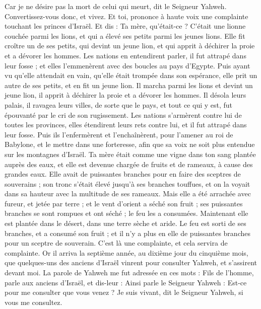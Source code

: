 \begin{multicols}{2}
Car je ne désire pas la mort de celui qui meurt, dit le Seigneur Yahweh. Convertissez-vous donc, et vivez.
\VerseOne{}Et toi, prononce à haute voix une complainte touchant les princes d'Israël.
Et dis : Ta mère, qu'était-ce ? C'était une lionne couchée parmi les lions, et qui a élevé ses petits parmi les jeunes lions.
Elle fit croître un de ses petits, qui devint un jeune lion, et qui apprit à déchirer la proie et a dévorer les hommes.
Les nations en entendirent parler, il fut attrapé dans leur fosse ; et elles l'emmenèrent avec des boucles au pays d'Egypte.
Puis ayant vu qu'elle attendait en vain, qu'elle était trompée dans son espérance, elle prit un autre de ses petits, et en fit un jeune lion.
Il marcha parmi les lions et devint un jeune lion, il apprit à déchirer la proie et a dévorer les hommes.
Il désola leurs palais, il ravagea leurs villes, de sorte que le pays, et tout ce qui y est, fut épouvanté par le cri de son rugissement.
Les nations s'armèrent contre lui de toutes les provinces, elles étendirent leurs rets contre lui, et il fut attrapé dans leur fosse.
Puis ils l'enfermèrent et l'enchaînèrent, pour l'amener au roi de Babylone, et le mettre dans une forteresse, afin que sa voix ne soit plus entendue sur les montagnes d'Israël.
Ta mère était comme une vigne dans ton sang plantée auprès des eaux, et elle est devenue chargée de fruits et de rameaux, à cause des grandes eaux.
Elle avait de puissantes branches pour en faire des sceptres de souverains ; son tronc s'était élevé jusqu'à ses branches touffues, et on la voyait dans sa hauteur avec la multitude de ses rameaux.
Mais elle a été arrachée avec fureur, et jetée par terre ; et le vent d'orient a séché son fruit ; ses puissantes branches se sont rompues et ont séché ; le feu les a consumées.
Maintenant elle est plantée dans le désert, dans une terre sèche et aride.
Le feu est sorti de ses branches, et a consumé son fruit ; et il n'y a plus en elle de puissantes branches pour un sceptre de souverain. C'est là une complainte, et cela servira de complainte.
\VerseOne{}Or il arriva la septième année, au dixième jour du cinquième mois, que quelques-uns des anciens d'Israël vinrent pour consulter Yahweh, et s'assirent devant moi.
La parole de Yahweh me fut adressée en ces mots :
Fils de l'homme, parle aux anciens d'Israël, et dis-leur : Ainsi parle le Seigneur Yahweh : Est-ce pour me consulter que vous venez ? Je suis vivant, dit le Seigneur Yahweh, si vous me consultez.

\end{multicols}
